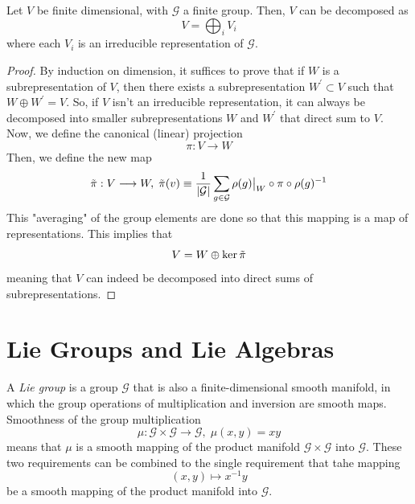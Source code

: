 \documentclass{article}
\begin{document}
  \begin{theorem}
    Let $V$ be finite dimensional, with $\mathcal{G}$ a finite group. Then, $V$ can be decomposed as 
    \begin{equation}
      V = \bigoplus_{i} V_i
    \end{equation}
    where each $V_i$ is an irreducible representation of $\mathcal{G}$. 
  \end{theorem}
  \begin{proof}
    By induction on dimension, it suffices to prove that if $W$ is a subrepresentation of $V$, then there exists a subrepresentation $W^\prime \subset V$ such that $W \oplus W^\prime = V$. So, if $V$ isn't an irreducible representation, it can always be decomposed into smaller subrepresentations $W$ and $W^\prime$ that direct sum to $V$. Now, we define the canonical (linear) projection 
    \begin{equation}
      \pi: V \longrightarrow W
    \end{equation}
    Then, we define the new map 
    \begin{equation}
      \Tilde{\pi}: V \longrightarrow W, \; \Tilde{\pi}(v) \equiv \frac{1}{|\mathcal{G}|} \sum_{g \in \mathcal{G}} \rho(g)\big|_W \circ \pi \circ \rho(g)^{-1}
    \end{equation}
    This "averaging" of the group elements are done so that this mapping is a map of representations. This implies that 
    \begin{equation}
      V = W \oplus \ker{\Tilde{\pi}}
    \end{equation}
    meaning that $V$ can indeed be decomposed into direct sums of subrepresentations. 
  \end{proof}

\section{Lie Groups and Lie Algebras}

    \begin{definition}
      A \textit{Lie group} is a group $\mathcal{G}$ that is also a finite-dimensional smooth manifold, in which the group operations of multiplication and inversion are smooth maps. Smoothness of the group multiplication
      \begin{equation}
        \mu: \mathcal{G} \times \mathcal{G} \longrightarrow \mathcal{G}, \; \mu(x, y) = x y
      \end{equation}
      means that $\mu$ is a smooth mapping of the product manifold $\mathcal{G} \times \mathcal{G}$ into $\mathcal{G}$. These two requirements can be combined to the single requirement that tahe mapping 
      \begin{equation}
        (x, y) \mapsto x^{-1} y
      \end{equation}
      be a smooth mapping of the product manifold into $\mathcal{G}$. 
    \end{definition}
\end{document}
